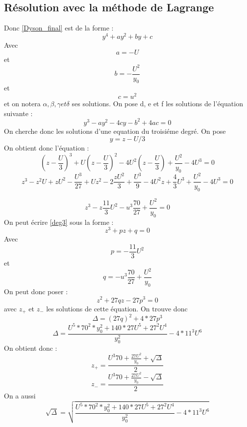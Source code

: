 \documentclass[12pt]{article}
\begin{document}
\subsection{R\'esolution avec la m\'ethode de Lagrange}
Donc \ref{Dyson_final} est de la forme :
\begin{equation}
y^4 + a y^2 + b y + c 
\end{equation}
Avec $$a = -U$$ et $$b = -\frac{U^2}{y_0}$$ et $$c = u^2$$
et on notera $\alpha, \beta, \gamma et \delta$ ses solutions. 
On pose d, e et f les solutions de l'\'equation suivante : 
\begin{equation}
y^3 - a y^2 -4cy - b^2 + 4 ac = 0
\end{equation}
On cherche donc les solutions d'une equation du troisi\'eme degr\'e.
On pose $$y = z - U/3$$
On obtient donc l'\'equation :
\begin{equation}
(z - \frac{U}{3})^3  + U (z - \frac{U}{3})^2 - 4 U ^2(z - \frac{U}{3}) + \frac{U^2}{y_0} - 4U^3 = 0
\end{equation}
\begin{equation}
z^3-z^2U+zU^2 - \frac{U^3}{27}+Uz^2-2\frac{zU^2}{3}+ \frac{U^3}{9} - 4U^2z+\frac{4}{3}U^3+\frac{U^2}{y_0}-4U^3 = 0
\end{equation}

\begin{equation}
\label{deg3}
z^3 - z\frac{11}{3}U^2 - u^3\frac{70}{27}+\frac{U^2}{y_0} = 0 
\end{equation}
On peut \'ecrire \ref{deg3} sous la forme :
\begin{equation}
z^3+pz+q = 0
\end{equation}
Avec $$p = -\frac{11}{3}U^2$$ et $$q = - u^3\frac{70}{27}+\frac{U^2}{y_0} $$
On peut donc poser :
\begin{equation}
z^2+27qz - 27p^3 = 0 
\end{equation}
avec $z_{+}$ et $z_{-}$ les solutions de cette \'equation.
On trouve donc $$\Delta = (27q)^2 + 4*27p^3$$
\begin{equation}
\Delta = \frac{U^5*70^2*y_0^2+ 140*27U^5+27^2U^4}{y_0^2} - 4*11^3U^6 
\end{equation}
On obtient donc :
\begin{equation}
z_+ = \frac{U^3 70 + \frac{27U^2}{y_0} +\sqrt{\Delta}}{2} 
\end{equation}
\begin{equation}
z_- = \frac{U^3 70 + \frac{27U^2}{y_0} -\sqrt{\Delta}}{2}  
\end{equation}
On a aussi
\begin{equation}
 \sqrt{\Delta} = \sqrt{\frac{U^5*70^2*y_0^2+ 140*27U^5+27^2U^4}{y_0^2} - 4*11^3U^6 }
\end{equation}
\end{document}
